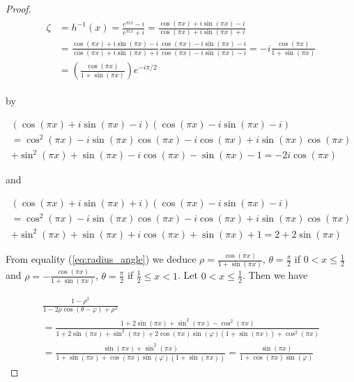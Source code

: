 \begin{proof}
\begin{gather}
	\begin{aligned}
		\zeta &= h^{-1}(x) = \frac{e^{\pi i x}- i}{e^{\pi i x} + i} = \frac{\cos(\pi x) + i\sin(\pi x) - i}{\cos(\pi x) + i\sin(\pi x) + i}\\
		&= \frac{\cos(\pi x) + i\sin(\pi x) - i}{\cos(\pi x) + i\sin(\pi x) + i}\frac{\cos(\pi x) - i\sin(\pi x) - i}{\cos(\pi x) - i\sin(\pi x) - i} = -i \frac{\cos(\pi x)}{1 + \sin(\pi x)}\\
		&= \left( \frac{\cos(\pi x)}{1 + \sin(\pi x)} \right)e^{-i\pi/2}
	\end{aligned}
	\label{eq:radius_angle}
\end{gather}

by

\begin{multline*}
	\left(\cos(\pi x) + i\sin(\pi x) - i\right)\left(\cos(\pi x) - i\sin(\pi x) - i\right)\\ = \cos^2(\pi x) - i\sin(\pi x)\cos(\pi x)	
		-i\cos(\pi x) + i\sin(\pi x)\cos(\pi x)\\
	 	+ \sin^2(\pi x) + \sin(\pi x) - i \cos(\pi x) - \sin(\pi x) - 1 = -2i \cos(\pi x)  
\end{multline*}

and
	
\begin{multline*}
	\left( \cos(\pi x) + i\sin(\pi x) + i \right)\left( \cos(\pi x) - i\sin(\pi x) - i \right)\\ = \cos^2(\pi x) - i\sin(\pi x)\cos(\pi x) - i\cos(\pi x) + i\sin(\pi x)\cos(\pi x)\\
	+ \sin^2(\pi x) + \sin(\pi x)+ i \cos(\pi x) + \sin(\pi x) + 1 = 2 + 2\sin(\pi x)
\end{multline*}

	From equality (\ref{eq:radius_angle}) we deduce $\rho = \frac{\cos(\pi x)}{1 + \sin(\pi x)}$, $\theta = \frac{\pi}{2}$ if $0 < x \leqslant \frac{1}{2}$ and $\rho = -\frac{\cos(\pi x)}{1 + \sin(\pi x)}$, $\theta = \frac{\pi}{2}$ if $\frac{1}{2} \leqslant x < 1$. Let $0 < x \leqslant \frac{1}{2}$. Then we have

\begin{multline*}
	\frac{1 - \rho^2}{1 - 2\rho\cos(\theta - \varphi) + \rho^2} \\= \frac{1 + 2\sin(\pi x) + \sin^2(\pi x) - \cos^2(\pi x)}{1 + 2\sin(\pi x) + \sin^2(\pi x) + 2\cos(\pi x)\sin(\varphi)(1 + \sin(\pi x)) + \cos^2(\pi x)}\\
	= \frac{\sin(\pi x) + \sin^2(\pi x)}{1 + \sin(\pi x) + \cos(\pi x)\sin(\varphi)(1 + \sin(\pi x))}
	= \frac{\sin(\pi x)}{1 + \cos(\pi x)\sin(\varphi)}
\end{multline*}


\end{proof}
